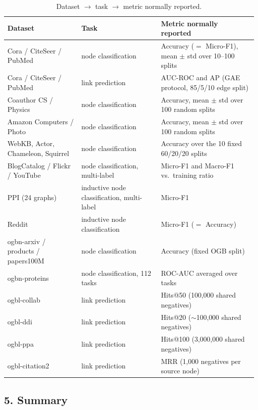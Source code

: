 \begin{table}[htbp]
\centering
\small
\caption{Dataset $\rightarrow$ task $\rightarrow$ metric normally reported.}
\label{p1:tab:metrics}
\setlength{\tabcolsep}{4pt}
\begin{tabular}{@{}>{\raggedright\arraybackslash}p{4.1cm}
                  >{\raggedright\arraybackslash}p{3.6cm}
                  >{\raggedright\arraybackslash}p{6.9cm}@{}}
\toprule
Dataset & Task & Metric normally reported \\
\midrule
Cora / CiteSeer / PubMed & node classification & Accuracy ($=$ Micro-F1), mean $\pm$ std over 10--100 splits \\
Cora / CiteSeer / PubMed & link prediction     & AUC-ROC and AP (GAE protocol, 85/5/10 edge split) \\
Coauthor CS / Physics    & node classification & Accuracy, mean $\pm$ std over 100 random splits \\
Amazon Computers / Photo & node classification & Accuracy, mean $\pm$ std over 100 random splits \\
WebKB, Actor, Chameleon, Squirrel & node classification & Accuracy over the 10 fixed 60/20/20 splits \\
BlogCatalog / Flickr / YouTube & node classification, multi-label & Micro-F1 and Macro-F1 vs.\ training ratio \\
PPI (24 graphs) & inductive node classification, multi-label & Micro-F1 \\
Reddit & inductive node classification & Micro-F1 ($=$ Accuracy) \\
ogbn-arxiv / products / papers100M & node classification & Accuracy (fixed OGB split) \\
ogbn-proteins & node classification, 112 tasks & ROC-AUC averaged over tasks \\
ogbl-collab & link prediction & Hits@50 (100{,}000 shared negatives) \\
ogbl-ddi & link prediction & Hits@20 ($\sim$100{,}000 shared negatives) \\
ogbl-ppa & link prediction & Hits@100 (3{,}000{,}000 shared negatives) \\
ogbl-citation2 & link prediction & MRR (1{,}000 negatives per source node) \\
\bottomrule
\end{tabular}
\end{table}

\subsection*{5. Summary}

